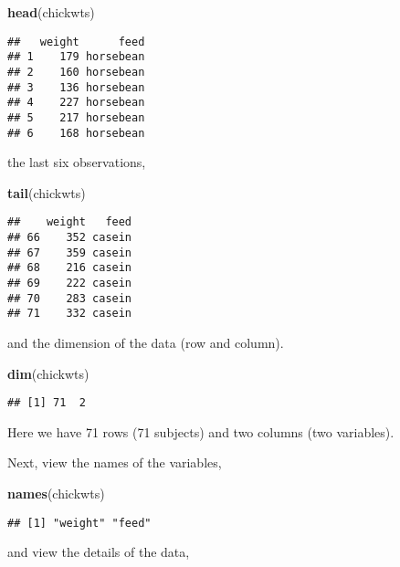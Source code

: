 \documentclass[]{book}
\newenvironment{Shaded}{\begin{snugshade}}{\end{snugshade}}
\newcommand{\KeywordTok}[1]{\textcolor[rgb]{0.13,0.29,0.53}{\textbf{{#1}}}}
\newcommand{\NormalTok}[1]{{#1}}
\theoremstyle{definition}
\theoremstyle{definition}
\theoremstyle{remark}
\begin{document}
\begin{Shaded}
\begin{Highlighting}[]
\KeywordTok{head}\NormalTok{(chickwts)}
\end{Highlighting}
\end{Shaded}

\begin{verbatim}
##   weight      feed
## 1    179 horsebean
## 2    160 horsebean
## 3    136 horsebean
## 4    227 horsebean
## 5    217 horsebean
## 6    168 horsebean
\end{verbatim}

the last six observations,

\begin{Shaded}
\begin{Highlighting}[]
\KeywordTok{tail}\NormalTok{(chickwts)}
\end{Highlighting}
\end{Shaded}

\begin{verbatim}
##    weight   feed
## 66    352 casein
## 67    359 casein
## 68    216 casein
## 69    222 casein
## 70    283 casein
## 71    332 casein
\end{verbatim}

and the dimension of the data (row and column).

\begin{Shaded}
\begin{Highlighting}[]
\KeywordTok{dim}\NormalTok{(chickwts)}
\end{Highlighting}
\end{Shaded}

\begin{verbatim}
## [1] 71  2
\end{verbatim}

Here we have 71 rows (71 subjects) and two columns (two variables).

Next, view the names of the variables,

\begin{Shaded}
\begin{Highlighting}[]
\KeywordTok{names}\NormalTok{(chickwts)}
\end{Highlighting}
\end{Shaded}

\begin{verbatim}
## [1] "weight" "feed"
\end{verbatim}

and view the details of the data,
\end{document}
